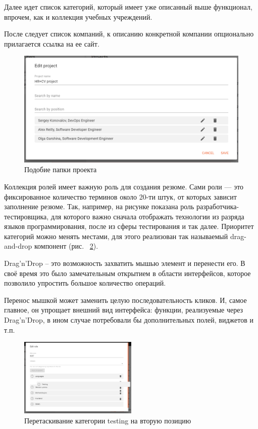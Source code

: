 \documentclass[14pt, a4paper]{diplom}
\begin{document}
Далее идет список категорий, который имеет уже описанный выше функционал, впрочем, как и коллекция учебных учреждений.

После следует список компаний, к описанию конкретной компании опционально прилагается ссылка на ее сайт.

\begin{figure}[!ht]
\centering
\includegraphics[width=1\textwidth]{resources/editProject.png}
\caption{Подобие папки проекта}
\label{18}
\end{figure}

Коллекция ролей имеет важную роль для создания резюме. Сами роли — это фиксированное количество терминов около 20-ти штук, от которых зависит заполнение резюме.
Так, например, на рисунке показана роль разработчика-тестировщика, для которого важно сначала отображать технологии из разряда языков программирования, после из сферы тестирования и так далее.
Приоритет категорий можно менять местами, для этого реализован так называемый drag-and-drop компонент (рис. ~\ref{19}).

Drag’n’Drop – это возможность захватить мышью элемент и перенести его. В своё время это было замечательным открытием в области интерфейсов, которое позволило упростить большое количество операций.

Перенос мышкой может заменить целую последовательность кликов. И, самое главное, он упрощает внешний вид интерфейса: функции, реализуемые через Drag’n’Drop, в ином случае потребовали бы дополнительных полей, виджетов и т.п.

\begin{figure}[!ht]
\centering
\includegraphics[width=0.5\textwidth]{resources/roles.png}
\caption{Перетаскивание категории testing на вторую позицию}
\label{19}
\end{figure}
\end{document}
